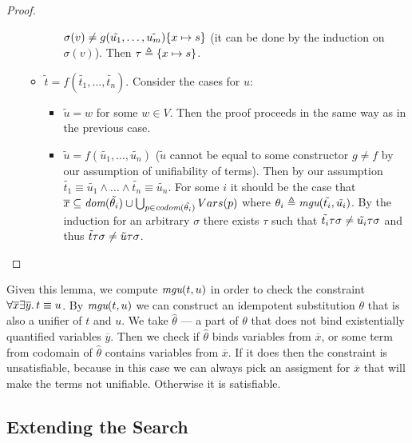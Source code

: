 \begin{proof}
\begin{itemize}
\begin{subproof}
\begin{itemize}
\begin{itemize}
            $\sigma(v) \neq \sapp{\{x \mapsto s\}}{g(\tilde{u_1}, \dots, \tilde{u_m})}$
            (it can be done by the induction on $\sigma(v)$).
            Then $\tau \defeq \{x \mapsto s\}$.
        \end{itemize}
        \item $\tilde{t} = f(\tilde{t_1}, \dots, \tilde{t_n})$. Consider the cases for $u$:
        \begin{itemize}
          \item $\tilde{u} = w$ for some $w \in V$. Then the proof proceeds in the same way as in the previous case.
          \item $\tilde{u} = f(\tilde{u_1}, \dots, \tilde{u_n})$ 
            ($\tilde{u}$ cannot be equal to some constructor $g \neq f$ by our assumption of unifiability of terms).
            Then by our assumption $\tilde{t_1} \equiv \tilde{u_1} \wedge \dots \wedge \tilde{t_n} \equiv \tilde{u_n}$.
            For some $i$ it should be the case that 
            $\overline{x} \subseteq \dom{\tilde{\theta_i}} \cup \bigcup_{p \in \codom{\tilde{\theta_i}}}Vars(p)$
            where $\theta_i \defeq \mgu(\tilde{t_i}, \tilde{u_i})$.
            By the induction for an arbitrary $\sigma$ there exists $\tau$ such that 
            $\sapp{\sigma}{\sapp{\tau}{\tilde{t_i}}} \neq \sapp{\sigma}{\sapp{\tau}{\tilde{u_i}}}$
            and thus $\sapp{\sigma}{\sapp{\tau}{\tilde{t}}} \neq \sapp{\sigma}{\sapp{\tau}{\tilde{u}}}$.
        \end{itemize}
      \end{itemize}
    \end{subproof}
  \end{itemize}
\end{proof}

  Given this lemma, we compute $\mgu(t, u)$ in order to check the constraint 
  $\forall \overline{x} \exists \overline{y}\ldotp t \equiv u$.
  By $\mgu(t, u)$ we can construct an idempotent substitution $\theta$ 
  that is also a unifier of $t$ and $u$.
  We take $\hat{\theta}$ --- a part of $\theta$
  that does not bind existentially quantified variables $\overline{y}$.
  Then we check if $\hat{\theta}$ binds variables from $\overline{x}$, 
  or some term from codomain of $\hat{\theta}$ contains variables from $\overline{x}$.
  If it does then the constraint is unsatisfiable, 
  because in this case we can always pick an assigment for $\overline{x}$
  that will make the terms not unifiable.
  Otherwise it is satisfiable.

\subsection{Extending the Search}

